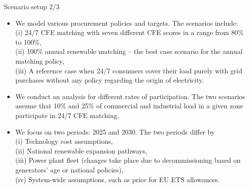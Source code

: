 \begin{frame}{Scenario setup 2/3}

  {\small 
  \begin{itemize}

  \item We model various procurement policies and targets. The scenarios include: \\
  (i) \alert{24/7 CFE matching} with seven different CFE scores in a range from 80\% to 100\%, \\
  (ii) \alert{100\% annual renewable matching} -- the best case scenario for the annual matching policy, \\
  (iii) \alert{A reference case} when 24/7 consumers cover their load purely with grid purchases 
  without any policy regarding the origin of electricity.

  \item We conduct an analysis for different rates of participation. The two scenarios 
  assume that \alert{10\%} and \alert{25\%} of commercial and industrial load
  in a given zone participate in 24/7 CFE matching.

  \item We focus on two periods: \alert{2025} and \alert{2030}. The two periods differ by \\ 
  (i) Technology cost assumptions, \\
  (ii) National renewable expansion pathways,\\
  (iii) Power plant fleet (changes take place due to decommissioning based on generators' 
  age or national policies), \\
  (iv) System-wide assumptions, such as price for EU ETS allowances.

  \end{itemize}
  }
\end{frame}




